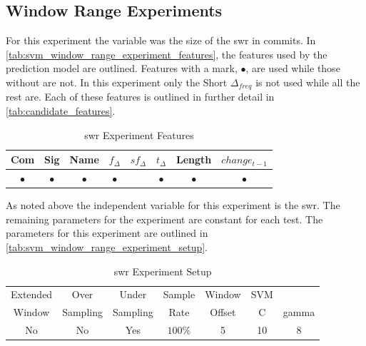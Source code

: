\subsection{Window Range Experiments}
\label{sec:svm_swr_experiment}


For this experiment the variable was the size of the \gls{swr} in commits. In \autoref{tab:svm_window_range_experiment_features}, the features used by the prediction model are outlined. Features with a mark, $\bullet$, are used while those without are not. In this experiment only the Short $\Delta_{freq}$ is not used while all the rest are. Each of these features is outlined in further detail in \autoref{tab:candidate_features}.

\begin{table}[h]
\begin{center}

    \begin{tabular}{|c|c|c|c|c|c|c|c|}
        \hline
        Com & Sig & Name & $f_{\Delta}$ & $sf_{\Delta}$ & $t_\Delta$ & Length & $change_{t-1}$ \\
        \hline
        $\bullet$ & $\bullet$ & $\bullet$ & $\bullet$ & & $\bullet$ & $\bullet$ & $\bullet$ \\ \hline
    \end{tabular}
    \caption{\gls{swr} Experiment Features}
    \label{tab:svm_window_range_experiment_features}
\end{center}
\end{table}


As noted above the independent variable for this experiment is the \gls{swr}. The remaining parameters for the experiment are constant for each test. The parameters for this experiment are outlined in \autoref{tab:svm_window_range_experiment_setup}.

\begin{table}[h]
\begin{center}

    \begin{tabular}{|c|c|c|c|c|cc|}
        \hline
        Extended & Over & Under & Sample & Window & SVM & \\
        Window & Sampling & Sampling & Rate & Offset & C & gamma \\ \hline
        No & No & Yes & $100\%$ & 5 & 10 & 8 \\ \hline
    \end{tabular}
    \caption{\gls{swr} Experiment Setup}
    \label{tab:svm_window_range_experiment_setup}
\end{center}

\end{table}

